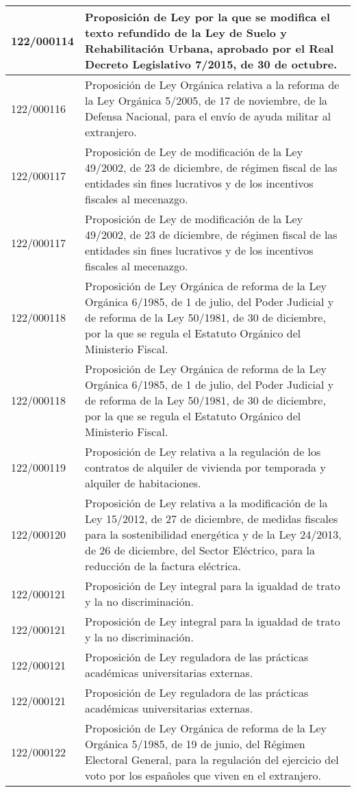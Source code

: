 {\begin{table}[H]
\begin{center}
\begin{tabularx}{\linewidth}{| l | X |}
\hline
122/000114 & Proposición de Ley por la que se modifica el texto refundido de la Ley de Suelo y Rehabilitación Urbana, aprobado por el Real Decreto Legislativo 7/2015, de 30 de octubre. \\
\hline
122/000116 & Proposición de Ley Orgánica relativa a la reforma de la Ley Orgánica 5/2005, de 17 de noviembre, de la Defensa Nacional, para el envío de ayuda militar al extranjero. \\
\hline
122/000117 & Proposición de Ley de modificación de la Ley 49/2002, de 23 de diciembre, de régimen fiscal de las entidades sin fines lucrativos y de los incentivos fiscales al mecenazgo. \\
\hline
122/000117 & Proposición de Ley de modificación de la Ley 49/2002, de 23 de diciembre, de régimen fiscal de las entidades sin fines lucrativos y de los incentivos fiscales al mecenazgo. \\
\hline
122/000118 & Proposición de Ley Orgánica de reforma de la Ley Orgánica 6/1985, de 1 de julio, del Poder Judicial y de reforma de la Ley 50/1981, de 30 de diciembre, por la que se regula el Estatuto Orgánico del Ministerio Fiscal. \\
\hline
122/000118 & Proposición de Ley Orgánica de reforma de la Ley Orgánica 6/1985, de 1 de julio, del Poder Judicial y de reforma de la Ley 50/1981, de 30 de diciembre, por la que se regula el Estatuto Orgánico del Ministerio Fiscal. \\
\hline
122/000119 & Proposición de Ley relativa a la regulación de los contratos de alquiler de vivienda por temporada y alquiler de habitaciones. \\
\hline
122/000120 & Proposición de Ley relativa a la modificación de la Ley 15/2012, de 27 de diciembre, de medidas fiscales para la sostenibilidad energética y de la Ley 24/2013, de 26 de diciembre, del Sector Eléctrico, para la reducción de la factura eléctrica. \\
\hline
122/000121 & Proposición de Ley integral para la igualdad de trato y la no discriminación. \\
\hline
122/000121 & Proposición de Ley integral para la igualdad de trato y la no discriminación. \\
\hline
122/000121 & Proposición de Ley reguladora de las prácticas académicas universitarias externas. \\
\hline
122/000121 & Proposición de Ley reguladora de las prácticas académicas universitarias externas. \\
\hline
122/000122 & Proposición de Ley Orgánica de reforma de la Ley Orgánica 5/1985, de 19 de junio, del Régimen Electoral General, para la regulación del ejercicio del voto por los españoles que viven en el extranjero. \\

\end{tabularx}
\end{center}
\end{table}}
